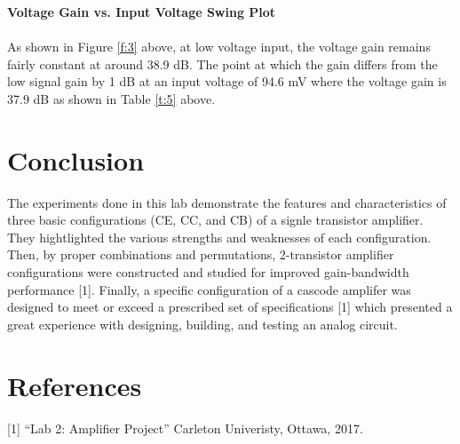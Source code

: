 \documentclass{article}
\begin{document}
	\noindent\textbf{Voltage Gain vs. Input Voltage Swing Plot}\\\\
	As shown in Figure \ref{f:3} above, at low voltage input, the voltage gain remains fairly constant at around 38.9 dB.
	The point at which the gain differs from the low signal gain by 1 dB at an input voltage of 94.6 mV where the voltage gain is 37.9 dB as shown in Table \ref{t:5} above.
	
	\pagebreak
	
	\section{Conclusion}
	The experiments done in this lab demonstrate the features and characteristics of three basic configurations (CE, CC, and CB) of a signle transistor amplifier.
	They hightlighted the various strengths and weaknesses of each configuration.
	Then, by proper combinations and permutations, 2-transistor amplifier configurations were constructed and studied for improved gain-bandwidth performance [1].
	Finally, a specific configuration of a cascode amplifer was designed to meet or exceed a prescribed set of specifications [1] which presented a great experience with designing, building, and testing an analog circuit.
	
	\pagebreak
	
	\section{References}
	[1] “Lab 2: Amplifier Project” Carleton Univeristy, Ottawa, 2017.	
\end{document}
